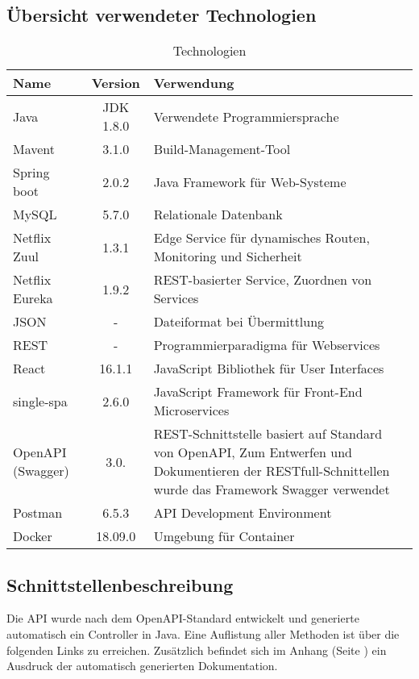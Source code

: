 \subsection{Übersicht verwendeter Technologien}
\renewcommand{\arraystretch}{1.3} %
\begin{table}[H] 
	\centering
	\caption{Technologien}
	\begin{tabularx}{\textwidth}{l|c|X}
		\textbf{Name} & \textbf{Version} & \textbf{Verwendung} \\
		\hline
		Java & JDK 1.8.0 & Verwendete Programmiersprache \\
		Mavent & 3.1.0  & Build-Management-Tool \\
		Spring boot & 2.0.2 & Java Framework für Web-Systeme \\
		MySQL & 5.7.0 & Relationale Datenbank \\
		Netflix Zuul & 1.3.1 & Edge Service für dynamisches Routen, \newline Monitoring und Sicherheit  \\
		Netflix Eureka & 1.9.2 & REST-basierter Service,  Zuordnen von Services   \\
		JSON & - & Dateiformat bei Übermittlung \\
		REST & - & Programmierparadigma für Webservices \\
		React & 16.1.1 & JavaScript Bibliothek für User Interfaces  \\
		single-spa & 2.6.0 & JavaScript Framework für Front-End Microservices \\
		OpenAPI  (Swagger) & 3.0. & REST-Schnittstelle basiert auf Standard von OpenAPI,  Zum Entwerfen und Dokumentieren der RESTfull-Schnittellen wurde das Framework Swagger verwendet \\
		Postman & 6.5.3 & API Development Environment \\
		Docker & 18.09.0 & Umgebung für Container \\
	\end{tabularx}
	\label{tab:Technologien}
\end{table}

\subsection{Schnittstellenbeschreibung}

Die API wurde nach dem OpenAPI-Standard entwickelt und generierte automatisch ein Controller in Java. Eine Auflistung aller Methoden ist über die folgenden Links zu erreichen. Zusätzlich befindet sich im Anhang (Seite \pageref{Anhang}) ein Ausdruck der automatisch generierten Dokumentation.


